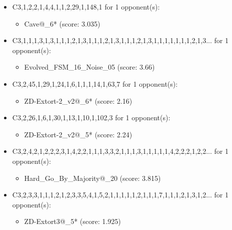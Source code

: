 \begin{appendices}
\begin{itemize}
    \item C3,1,2,2,1,4,4,1,1,2,29,1,148,1 for 1 opponent(s):
    \begin{multicols}{3}
         \begin{itemize}
            \item Cave@\_6* (score: 3.035)
        \end{itemize}
     \end{multicols}
     
    \item C3,1,1,1,3,1,3,1,1,1,2,1,3,1,1,1,2,1,3,1,1,1,2,1,3,1,1,1,1,1,1,1,2,1,3... for 1 opponent(s):
    \begin{multicols}{3}
         \begin{itemize}
            \item Evolved\_FSM\_16\_Noise\_05 (score: 3.66)
        \end{itemize}
     \end{multicols}
     
    \item C3,2,45,1,29,1,24,1,6,1,1,1,14,1,63,7 for 1 opponent(s):
    \begin{multicols}{3}
         \begin{itemize}
            \item ZD-Extort-2\_v2@\_6* (score: 2.16)
        \end{itemize}
     \end{multicols}
     
    \item C3,2,26,1,6,1,30,1,13,1,10,1,102,3 for 1 opponent(s):
    \begin{multicols}{3}
         \begin{itemize}
            \item ZD-Extort-2\_v2@\_5* (score: 2.24)
        \end{itemize}
     \end{multicols}
     
    \item C3,2,4,2,1,2,2,2,3,1,4,2,2,1,1,1,3,3,2,1,1,1,3,1,1,1,1,1,4,2,2,2,1,2,2... for 1 opponent(s):
    \begin{multicols}{3}
         \begin{itemize}
            \item Hard\_Go\_By\_Majority@\_20 (score: 3.815)
        \end{itemize}
     \end{multicols}
     
    \item C3,2,3,3,1,1,1,2,1,2,3,3,5,4,1,5,2,1,1,1,1,1,2,1,1,1,7,1,1,1,2,1,3,1,2... for 1 opponent(s):
    \begin{multicols}{3}
         \begin{itemize}
            \item ZD-Extort3@\_5* (score: 1.925)
        \end{itemize}
     \end{multicols}
     

\end{itemize}
\end{appendices}
